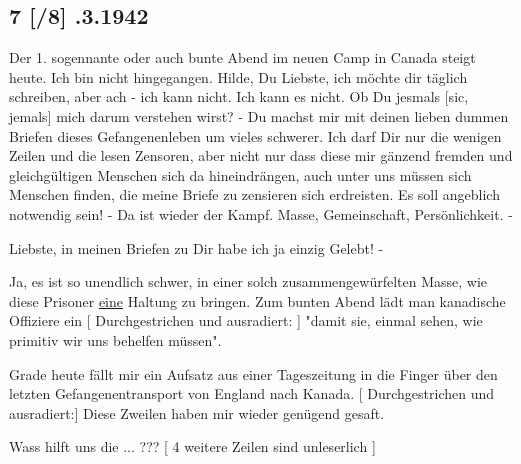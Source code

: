\subsection{7{\color{red} [/8] }.3.1942}

Der 1. sogennante oder auch bunte Abend im neuen Camp in Canada steigt heute.
Ich bin nicht hingegangen.
Hilde, Du Liebste, ich m\"{o}chte dir t\"{a}glich schreiben, aber ach - ich kann nicht.
Ich kann es nicht.
Ob Du jesmals{\color{red} [sic, jemals] } mich darum verstehen wirst?
- Du machst mir mit deinen lieben dummen Briefen dieses Gefangenenleben um vieles schwerer.
Ich darf Dir nur die wenigen Zeilen und die lesen Zensoren, aber nicht nur dass diese mir g\"{a}nzend fremden und gleichg\"{u}ltigen Menschen sich da hineindr\"{a}ngen, auch unter uns m\"{u}ssen sich Menschen finden, die meine Briefe zu zensieren sich erdreisten.
Es soll angeblich notwendig sein!
- Da ist wieder der Kampf.
Masse, Gemeinschaft, Pers\"{o}nlichkeit. -

Liebste, in meinen Briefen zu Dir habe ich ja einzig Gelebt! -

Ja, es ist so unendlich schwer, in einer solch zusammengew\"{u}rfelten Masse, wie diese Prisoner \ul{eine} Haltung zu bringen.
Zum bunten Abend l\"{a}dt man kanadische Offiziere ein
{\color{red} [ Durchgestrichen und ausradiert: ] } "damit sie, einmal sehen, wie primitiv wir uns behelfen m\"{u}ssen".

Grade heute f\"{a}llt mir ein Aufsatz aus einer Tageszeitung in die Finger \"{u}ber den letzten Gefangenentransport von England nach Kanada.
{\color{red} [ Durchgestrichen und ausradiert:] }
Diese Zweilen haben mir wieder gen\"{u}gend gesaft.

Wass hilft uns die ... ???
{\color{red} [ 4 weitere Zeilen sind unleserlich ] }

\clearpage
